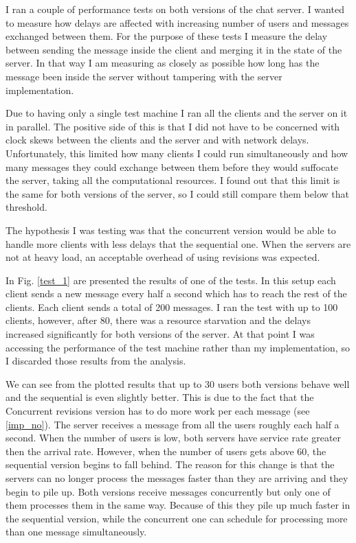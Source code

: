 \documentclass[12pt,twoside,notitlepage]{report}
\begin{document}
I ran a couple of performance tests on both versions of the chat server. I wanted to measure how delays are affected with increasing number of users and messages exchanged between them. For the purpose of these tests I measure the delay between sending the message inside the client and merging it in the state of the server. In that way I am measuring as closely as possible how long has the message been inside the server without tampering with the server implementation.

Due to having only a single test machine I ran all the clients and the server on it in parallel. The positive side of this is that I did not have to be concerned with clock skews between the clients and the server and with network delays. Unfortunately, this limited how many clients I could run simultaneously and how many messages they could exchange between them before they would suffocate the server, taking all the computational resources. I found out that this limit is the same for both versions of the server, so I could still compare them below that threshold.

The hypothesis I was testing was that the concurrent version would be able to handle more clients with less delays that the sequential one. When the servers are not at heavy load, an acceptable overhead of using revisions was expected.

In Fig. \ref{test_1} are presented the results of one of the tests. In this setup each client sends a new message every half a second which has to reach the rest of the clients. Each client sends a total of 200 messages. I ran the test with up to 100 clients, however, after 80, there was a resource starvation and the delays increased significantly for both versions of the server. At that point I was accessing the performance of the test machine rather than my implementation, so I discarded those results from the analysis.

We can see from the plotted results that up to 30 users both versions behave well and the sequential is even slightly better. This is due to the fact that the Concurrent revisions version has to do more work per each message (see \ref{imp_no}). The server receives a message from all the users roughly each half a second. When the number of users is low, both servers have service rate greater then the arrival rate. However, when the number of users gets above 60, the sequential version begins to fall behind. The reason for this change is that the servers can no longer process the messages faster than they are arriving and they begin to pile up. Both versions receive messages concurrently but only one of them processes them in the same way. Because of this they pile up much faster in the sequential version, while the concurrent one can schedule for processing more than one message simultaneously. 
\end{document}
